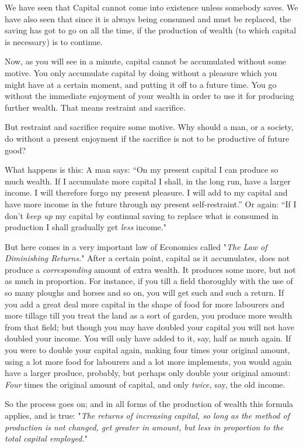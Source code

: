 \documentclass{book}
\begin{document}
We have seen that Capital cannot come into existence unless somebody saves. We have also seen that since it is always being consumed and must be replaced, the saving has got to go on all the time, if the production of wealth (to which capital is necessary) is to continue.

Now, as you will see in a minute, capital cannot be accumulated without some motive. You only accumulate capital by doing without a pleasure which you might have at a certain moment, and putting it off to a future time. You go without the immediate enjoyment of your wealth in order to use it for producing further wealth. That means restraint and sacrifice.

But restraint and sacrifice require some motive. Why should a man, or a society, do without a present enjoyment if the sacrifice is not to be productive of future good?

What happens is this: A man says: “On my present capital I can produce so much wealth. If I accumulate more capital I shall, in the long run, have a larger income. I will therefore forgo my present pleasure. I will add to my capital and have more income in the future through my present self-restraint.” Or again: “If I don’t \emph{keep up} my capital by continual saving to replace what is consumed in production I shall gradually get \emph{less} income."

But here comes in a very important law of Economics called "\emph{The Law of Diminishing Returns.}" After a certain point, capital as it accumulates, does not produce a \emph{corresponding} amount of extra wealth. It produces some more, but not as much in proportion. For instance, if you till a field thoroughly with the use of so many ploughs and horses and so on, you will get such and such a return. If you add a great deal more capital in the shape of food for more labourers and more tillage till you treat the land as a sort of garden, you produce more wealth from that field; but though you may have doubled your capital you will not have doubled your income. You will only have added to it, say, half as much again. If you were to double your capital again, making four times your original amount, using a lot more food for labourers and a lot more implements, you would again have a larger produce, probably, but perhaps only double your original amount: \emph{Four} times the original amount of capital, and only \emph{twice,} say, the old income.

So the process goes on; and in all forms of the production of wealth this formula applies, and is true: "\emph{The returns of increasing capital, so long as the method of production is not changed, get greater in amount, but less in proportion to the total capital employed.}"
\end{document}
